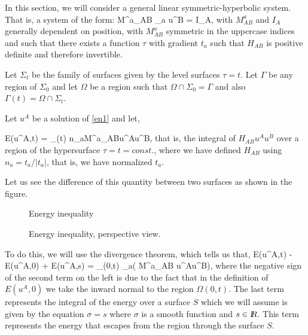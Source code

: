 
In this section, we will consider a general linear symmetric-hyperbolic system. That is, a system of the form: \beq M^a_{AB} \na_a u^B = I_A, \label{en1} \eeq with $M^a_{AB}$ and $I_A$ generally dependent on position, with $M^a_{AB}$ symmetric in the uppercase indices and such that there exists a function $\tau$ with gradient $t_a$ such that $H_{AB}$ is positive definite and therefore invertible.

Let $\Sigma_t$ be the family of surfaces given by the level surfaces $\tau = t$. Let $\Gamma$ be any region of $\Sigma_0$ and let $\Omega$ be a region such that $\Omega \cap \Sigma_0= \Gamma$ and also $\Gamma(t) = \Omega \cap \Sigma_t$.

Let $u^A$ be a solution of \ref{en1} and let,

\beq E(u^A,t) = \int_{\Gamma(t)} n_aM^a_{AB}u^Au^B, \eeq that is, the integral of $H_{AB}u^Au^B$ over a region of the hypersurface $\tau=t=const.$, where we have defined $H_{AB}$ using $n_a = t_a/|t_a|$, that is, we have normalized $t_a$.

Let us see the difference of this quantity between two surfaces as shown in the figure.

\espa %
\begin{figure}[htbp] 
    \begin{center} 
        \caption{Energy inequality} 
        \label{fig:13_5b} 
    \end{center}
\end{figure}
\espa

\begin{figure}[htbp] 
    \begin{center}  
    \caption{Energy inequality, perspective view.} 
    \label{fig:13_5} 
    \end{center}
\end{figure}

To do this, we will use the divergence theorem, which tells us that, 
\beq 
E(u^A,t) - E(u^A,0) + E(u^A,s) = \int_{\Omega(0,t)} \na_a( M^a_{AB} u^Au^B), 
\eeq 
where the negative sign of the second term on the left is due to the fact that in the definition of $E(u^A,0)$ 
we take the inward normal to the region $\Omega(0,t)$. 
The last term represents the integral of the energy over a surface $S$ which we will assume is given by the 
equation $\sigma = s$ where $\sigma$ is a smooth function and $s \in \mbox{\sl {l$\!\!\!\;\:\!$R}}$. 
This term represents the energy that escapes from the region through the surface $S$.


